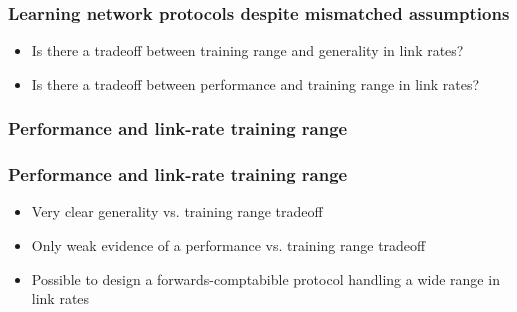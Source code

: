 \begin{frame}
\frametitle{Learning network protocols despite mismatched assumptions}
\begin{itemize}
\item<2-> Is there a tradeoff between training range and generality in link rates?
\item<3-> Is there a tradeoff between performance and training range in link rates?
\end{itemize}
\end{frame}


\begin{frame}
\frametitle{Performance and link-rate training range}
\begin{centering}

\noindent {}

\end{centering}
\end{frame}

\begin{frame}
\frametitle{Performance and link-rate training range}
\begin{itemize}
\item <2->{Very clear generality vs. training range tradeoff}
\item <3->{Only weak evidence of a performance vs. training range tradeoff}
\item <4->{Possible to design a forwards-comptabible protocol handling a wide range in link rates}
\end{itemize}
\end{frame}
